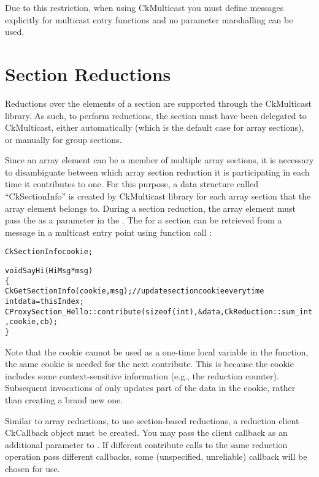 Due to this restriction, when using CkMulticast you must define messages explicitly for multicast
entry functions and no parameter marshalling can be used.

\section{Section Reductions}

Reductions over the elements of a section are supported through the CkMulticast library.
As such, to perform reductions, the section must have been delegated to
CkMulticast, either automatically (which is the default case for array sections),
or manually for group sections.

Since an array element can be a member of multiple array sections,
it is necessary to disambiguate between which array
section reduction it is participating in each time it contributes to one. For this purpose, a data structure
called ``CkSectionInfo'' is created by CkMulticast library for each
array section that the array element belongs to.
During a section reduction, the array element must pass the
 as a parameter in the .
The  for a section can be retrieved
from a message in a multicast entry point using function call
:

\begin{alltt}
  CkSectionInfo cookie;

  void SayHi(HiMsg *msg)
  \{
    CkGetSectionInfo(cookie, msg);     // update section cookie every time
    int data = thisIndex;
    CProxySection_Hello::contribute(sizeof(int), &data, CkReduction::sum_int, cookie, cb);
  \}
\end{alltt}


Note that the cookie cannot be used as a one-time local variable in the 
function, the same cookie is needed for the next contribute. This is 
because the cookie includes some context-sensitive information (e.g., the 
reduction counter). Subsequent invocations of  only updates 
part of the data in the cookie, rather than creating a brand new one.

Similar to array reductions, to use section-based reductions, a
reduction client CkCallback object must be created. You may pass the
client callback as an additional parameter to . If
different contribute calls to the same reduction operation pass
different callbacks, some (unspecified, unreliable) callback will be
chosen for use. 


